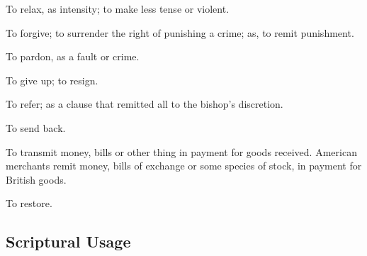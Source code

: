 		\begin{compactitem}
			\item[1] To relax, as intensity; to make less tense or violent.
			\item[2] To forgive; to surrender the right of punishing a crime; as, to remit punishment.
			\item[3] To pardon, as a fault or crime.
			\item[4] To give up; to resign.
			\item[5] To refer; as a clause that remitted all to the bishop's discretion.
			\item[6] To send back.
			\item[7] To transmit money, bills or other thing in payment for goods received. American merchants remit money, bills of exchange or some species of stock, in payment for British goods.
			\item[8] To restore.
		\end{compactitem}



\subsection{Scriptural Usage} %
	\label{REMISSION-SCRIPTURES}

	
	
			
